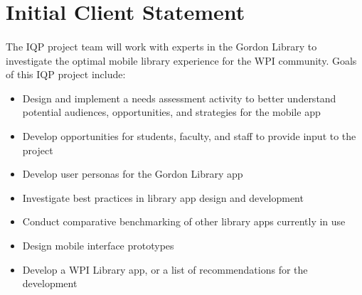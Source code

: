 \section{Initial Client Statement}
    \paragraph{}
    
The IQP project team will work with experts in the Gordon Library to investigate the optimal mobile library experience for the WPI community. Goals of this IQP project include:
\begin{itemize}
\item Design and implement a needs assessment activity to better understand potential audiences, opportunities, and strategies for the mobile app
\item Develop opportunities for students, faculty, and staff to provide input to the project
\item Develop user personas for the Gordon Library app
\item Investigate best practices in library app design and development
\item Conduct comparative benchmarking of other library apps currently in use
\item Design mobile interface prototypes
\item Develop a WPI Library app, or a list of recommendations for the development
\end{itemize}